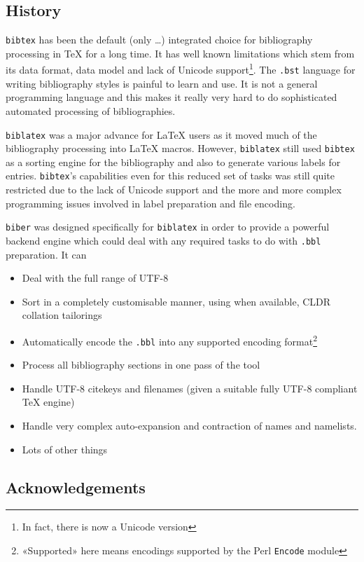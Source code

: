 \documentclass{ltxdockit}
\begin{document}
\subsection{History}

\verb+bibtex+ has been the default (only \ldots) integrated choice for
bibliography processing in TeX for a long time. It has well known
limitations which stem from its data format, data model and lack of Unicode
support\footnote{In fact, there is now a Unicode version}. The
\verb+.bst+ language for writing bibliography styles is painful to learn
and use. It is not a general programming language and this makes it really
very hard to do sophisticated automated processing of bibliographies.

\verb+biblatex+ was a major advance for LaTeX users as it moved much
of the bibliography processing into LaTeX macros. However,
\verb+biblatex+ still used \verb+bibtex+ as a sorting engine for the
bibliography and also to generate various labels for
entries. \verb+bibtex+'s capabilities even for this reduced set of
tasks was still quite restricted due to the lack of Unicode support and
the more and more complex programming issues involved in label
preparation and file encoding.

\verb+biber+ was designed specifically for \verb+biblatex+ in order to
provide a powerful backend engine which could deal with any required
tasks to do with \verb+.bbl+ preparation. It can

\begin{itemize}
\item Deal with the full range of UTF-8
\item Sort in a completely customisable manner, using when available,
  CLDR collation tailorings
\item Automatically encode the \verb+.bbl+ into any supported encoding
  format\footnote{«Supported» here means encodings supported by the
    Perl \texttt{Encode} module}
\item Process all bibliography sections in one pass of the tool
\item Handle UTF-8 citekeys and filenames (given a suitable fully
  UTF-8 compliant TeX engine)
\item Handle very complex auto-expansion and contraction of names and
  namelists.
\item Lots of other things
\end{itemize}

\subsection{Acknowledgements}
\end{document}

